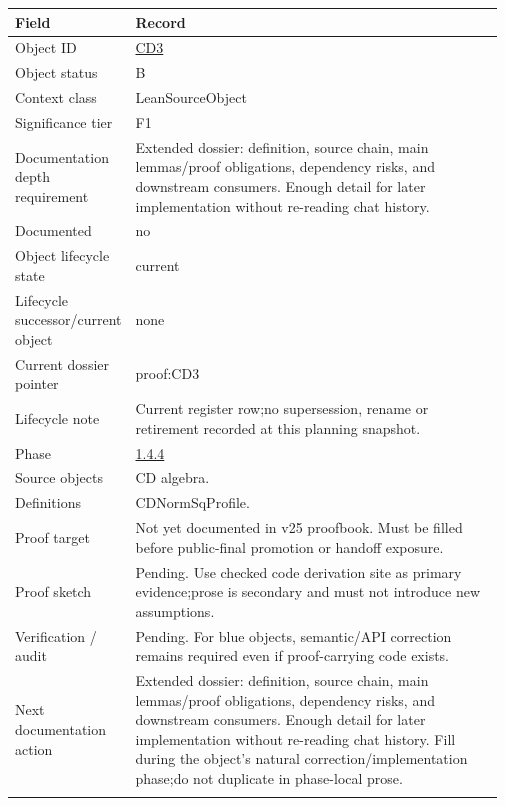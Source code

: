 \begin{longtable}{L{0.16\linewidth} L{0.81\linewidth}}
\hline
\textbf{Field} & \textbf{Record}\\
\hline
Object ID & \hyperlink{object-row-CD3}{CD3}\\
\hline\addlinespace[0.20em]
Object status & B\\
\hline\addlinespace[0.20em]
Context class & LeanSourceObject\\
\hline\addlinespace[0.20em]
Significance tier & F1\\
\hline\addlinespace[0.20em]
Documentation depth requirement & Extended dossier: definition, source chain, main lemmas/\allowbreak{}proof obligations, dependency risks, and downstream consumers. Enough detail for later implementation without re-reading chat history.\\
\hline\addlinespace[0.20em]
Documented & no\\
\hline\addlinespace[0.20em]
Object lifecycle state & current\\
\hline\addlinespace[0.20em]
Lifecycle successor/\allowbreak{}current object & none\\
\hline\addlinespace[0.20em]
Current dossier pointer & proof:CD3\\
\hline\addlinespace[0.20em]
Lifecycle note & Current register row;\newline no supersession, rename or retirement recorded at this planning snapshot.\\
\hline\addlinespace[0.20em]
Phase & \hyperlink{phase-row-1-4-4}{1.4.4}\\
\hline\addlinespace[0.20em]
Source objects & CD algebra.\\
\hline\addlinespace[0.20em]
Definitions & CDNormSqProfile.\\
\hline\addlinespace[0.20em]
Proof target & Not yet documented in v25 proofbook. Must be filled before public-final promotion or handoff exposure.\\
\hline\addlinespace[0.20em]
Proof sketch & Pending. Use checked code derivation site as primary evidence;\newline prose is secondary and must not introduce new assumptions.\\
\hline\addlinespace[0.20em]
Verification /\allowbreak{} audit & Pending. For blue objects, semantic/\allowbreak{}API correction remains required even if proof-carrying code exists.\\
\hline\addlinespace[0.20em]
Next documentation action & Extended dossier: definition, source chain, main lemmas/\allowbreak{}proof obligations, dependency risks, and downstream consumers. Enough detail for later implementation without re-reading chat history. Fill during the object's natural correction/\allowbreak{}implementation phase;\newline do not duplicate in phase-local prose.\\
\hline\addlinespace[0.20em]
\end{longtable}
